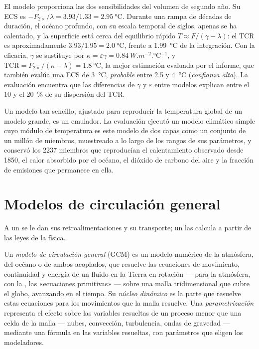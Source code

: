 El modelo proporciona las dos sensibilidades del volumen de segundo año. Su ECS es
$-F_{2\times}/\lambda = 3.93/1.33 = \qty{2.95}{\celsius}$. Durante una rampa
de décadas de duración, el océano profundo, con su escala temporal de siglos, apenas se ha
calentado, y la superficie está cerca del equilibrio rápido $T \approx F/(\gamma -
\lambda)$: el TCR es aproximadamente $3.93/1.95 = \qty{2.0}{\celsius}$, frente a
\qty{1.99}{\celsius} de la integración. Con la eficacia, $\gamma$ se sustituye
por $\kappa = \varepsilon\gamma = \qty{0.84}{W.m^{-2}.\celsius^{-1}}$,
y $\text{TCR} = F_{2\times}/(\kappa - \lambda) = \qty{1.8}{\celsius}$,
la mejor estimación evaluada por el informe, que también evalúa una ECS de
\qty{3}{\celsius}, \emph{probable} entre 2.5 y \qty{4}{\celsius} (\emph{confianza
alta}). La evaluación encuentra que las diferencias de $\gamma$ y
$\varepsilon$ entre modelos explican entre el 10 y el \qty{20}{\percent} de su
dispersión del TCR.

Un modelo tan sencillo, ajustado para reproducir la temperatura global de un
modelo grande, es un emulador. La evaluación ejecutó un modelo climático simple cuyo módulo de temperatura es
este modelo de dos capas como un conjunto de un millón de miembros, muestreado a lo largo de los
rangos de sus parámetros, y conservó los 2237 miembros que reproducían el
calentamiento observado desde 1850, el calor absorbido por el océano, el
dióxido de carbono del aire y la fracción de emisiones que permanece en ella.

\section{Modelos de circulación general}\label{sec:b3:climate-models:gcm}

A un  se le dan sus retroalimentaciones y su transporte; un
 las calcula a partir de las leyes de la física.

\begin{definition}\label{def:b3:climate-models:gcm}
Un \emph{modelo de circulación general} (GCM)
es un modelo numérico de la atmósfera, del océano o de ambos acoplados,
que resuelve las ecuaciones de movimiento, continuidad y energía de un fluido en
la Tierra en rotación --- para la atmósfera, con la
, las «ecuaciones primitivas» --- sobre una malla tridimensional
que cubre el globo, avanzando en el tiempo. Su \emph{núcleo
dinámico} es la parte que resuelve estas ecuaciones para
los movimientos que la malla resuelve. Una
\emph{parametrización} representa el efecto sobre
las variables resueltas de un proceso menor que una celda de la malla --- nubes,
convección, turbulencia, ondas de gravedad --- mediante una fórmula en las
variables resueltas, con parámetros que eligen los modeladores.
\end{definition}

